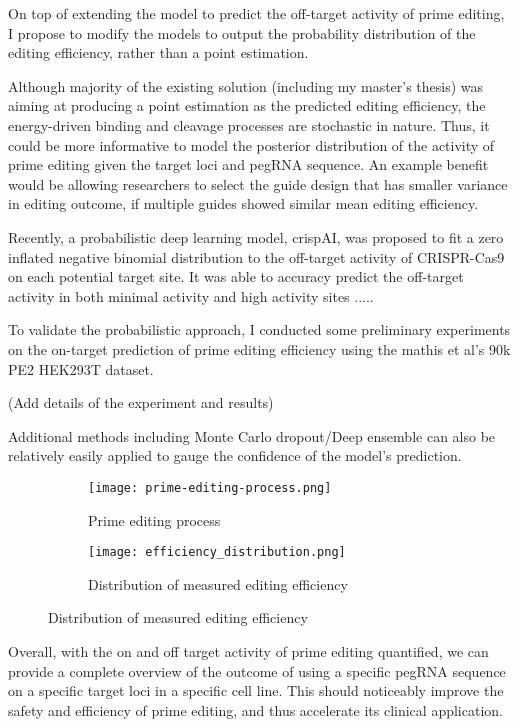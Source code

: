 \documentclass[a4,12pt]{article}
\begin{document}
On top of extending the model to predict the off-target activity of prime editing, I propose to modify the models to output the probability distribution of the editing efficiency, rather than a point estimation.

Although majority of the existing solution (including my master's thesis) was aiming at producing a point estimation as the predicted editing efficiency\parencite{mathisMachineLearningPrediction2024,yuPredictionEfficienciesDiverse2023,koeppelPredictionPrimeEditing2023}, the energy-driven binding and cleavage processes are stochastic in nature\cite{stortzPiCRISPRPhysicallyInformed2023}. Thus, it could be more informative to model the posterior distribution of the activity of prime editing given the target loci and pegRNA sequence. An example benefit would be allowing researchers to select the guide design that has smaller variance in editing outcome, if multiple guides showed similar mean editing efficiency.

Recently, a probabilistic deep learning model, crispAI, was proposed to fit a zero inflated negative binomial distribution to the off-target activity of CRISPR-Cas9 on each potential target site\parencite{ozdenLearningQuantifyUncertainty2024}. It was able to accuracy predict the off-target activity in both minimal activity and high activity sites .....

To validate the probabilistic approach, I conducted some preliminary experiments on the on-target prediction of prime editing efficiency using the mathis et al's 90k PE2 HEK293T dataset\parencite{mathisPredictingPrimeEditing2023}. 

(Add details of the experiment and results)

Additional methods including Monte Carlo dropout\parencite{galDropoutBayesianApproximation2016}/Deep ensemble can also be relatively easily applied to gauge the confidence of the model's prediction.


\begin{figure}
    \centering
    \begin{subfigure}{0.4\textwidth}
        \texttt{[image: prime-editing-process.png]}
        \caption{Prime editing process}
        \label{fig:prime-editing-process}
    \end{subfigure}
    \begin{subfigure}{0.3\textwidth}
        \texttt{[image: efficiency\_distribution.png]}
        \caption{Distribution of measured editing efficiency}
    \end{subfigure}
\end{figure}

Overall, with the on and off target activity of prime editing quantified, we can provide a complete overview of the outcome of using a specific pegRNA sequence on a specific target loci in a specific cell line. This should noticeably improve the safety and efficiency of prime editing, and thus accelerate its clinical application.

\printbibliography
\end{document}
